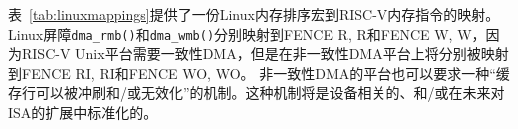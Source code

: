 表~\ref{tab:linuxmappings}提供了一份Linux内存排序宏到RISC-V内存指令的映射。
Linux屏障{\tt dma\_rmb()}和{\tt dma\_wmb()}分别映射到FENCE R, R和FENCE W, W，因为RISC-V Unix平台需要一致性DMA，但是在非一致性DMA平台上将分别被映射到FENCE RI, RI和FENCE WO, WO。
非一致性DMA的平台也可以要求一种“缓存行可以被冲刷和/或无效化”的机制。这种机制将是设备相关的、和/或在未来对ISA的扩展中标准化的。

